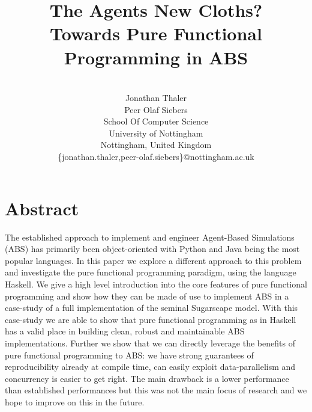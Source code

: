 \documentclass{scspaperproc}
\begin{document}


\title{The Agents New Cloths? \\ \small{Towards Pure Functional Programming in ABS}}

\author{
\\%
Jonathan Thaler \\ 
Peer Olaf Siebers \\ [12pt] 
School Of Computer Science \\
University of Nottingham \\
Nottingham, United Kingdom \\
\{jonathan.thaler,peer-olaf.siebers\}@nottingham.ac.uk\\
}

\maketitle

\section*{Abstract}
The established approach to implement and engineer Agent-Based Simulations (ABS) has primarily been object-oriented with Python and Java being the most popular languages. In this paper we explore a different approach to this problem and investigate the pure functional programming paradigm, using the language Haskell. We give a high level introduction into the core features of pure functional programming and show how they can be made of use to implement ABS in a case-study of a full implementation of the seminal Sugarscape model. With this case-study we are able to show that pure functional programming as in Haskell has a valid place in building clean, robust and maintainable ABS implementations. Further we show that we can directly leverage the benefits of pure functional programming to ABS: we have strong guarantees of reproducibility already at compile time, can easily exploit data-parallelism and concurrency is easier to get right. The main drawback is a lower performance than established performances but this was not the main focus of research and we hope to improve on this in the future.
\end{document}
